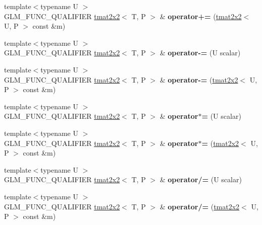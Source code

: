 \begin{DoxyCompactItemize}
{\footnotesize template$<$typename U $>$ }\\G\+L\+M\+\_\+\+F\+U\+N\+C\+\_\+\+Q\+U\+A\+L\+I\+F\+I\+ER \hyperlink{structglm_1_1tmat2x2}{tmat2x2}$<$ T, P $>$ \& {\bfseries operator+=} (\hyperlink{structglm_1_1tmat2x2}{tmat2x2}$<$ U, P $>$ const \&m)
\item 
\mbox{\label{structglm_1_1tmat2x2_a07fbdd2d18d893c7d6c1b662786983ea}} 
{\footnotesize template$<$typename U $>$ }\\G\+L\+M\+\_\+\+F\+U\+N\+C\+\_\+\+Q\+U\+A\+L\+I\+F\+I\+ER \hyperlink{structglm_1_1tmat2x2}{tmat2x2}$<$ T, P $>$ \& {\bfseries operator-\/=} (U scalar)
\item 
\mbox{\label{structglm_1_1tmat2x2_aa547a3bd8160981d285b9fef6cb5eff1}} 
{\footnotesize template$<$typename U $>$ }\\G\+L\+M\+\_\+\+F\+U\+N\+C\+\_\+\+Q\+U\+A\+L\+I\+F\+I\+ER \hyperlink{structglm_1_1tmat2x2}{tmat2x2}$<$ T, P $>$ \& {\bfseries operator-\/=} (\hyperlink{structglm_1_1tmat2x2}{tmat2x2}$<$ U, P $>$ const \&m)
\item 
\mbox{\label{structglm_1_1tmat2x2_afe45ccf1c28b8e1519655b717e75745f}} 
{\footnotesize template$<$typename U $>$ }\\G\+L\+M\+\_\+\+F\+U\+N\+C\+\_\+\+Q\+U\+A\+L\+I\+F\+I\+ER \hyperlink{structglm_1_1tmat2x2}{tmat2x2}$<$ T, P $>$ \& {\bfseries operator$\ast$=} (U scalar)
\item 
\mbox{\label{structglm_1_1tmat2x2_ae5777c0b61d77643916a6228c1bad207}} 
{\footnotesize template$<$typename U $>$ }\\G\+L\+M\+\_\+\+F\+U\+N\+C\+\_\+\+Q\+U\+A\+L\+I\+F\+I\+ER \hyperlink{structglm_1_1tmat2x2}{tmat2x2}$<$ T, P $>$ \& {\bfseries operator$\ast$=} (\hyperlink{structglm_1_1tmat2x2}{tmat2x2}$<$ U, P $>$ const \&m)
\item 
\mbox{\label{structglm_1_1tmat2x2_ad53aeb4165a4776038788c1c03a87c6e}} 
{\footnotesize template$<$typename U $>$ }\\G\+L\+M\+\_\+\+F\+U\+N\+C\+\_\+\+Q\+U\+A\+L\+I\+F\+I\+ER \hyperlink{structglm_1_1tmat2x2}{tmat2x2}$<$ T, P $>$ \& {\bfseries operator/=} (U scalar)
\item 
\mbox{\label{structglm_1_1tmat2x2_a3d12dbc4378d84707572ab61ae1b1b30}} 
{\footnotesize template$<$typename U $>$ }\\G\+L\+M\+\_\+\+F\+U\+N\+C\+\_\+\+Q\+U\+A\+L\+I\+F\+I\+ER \hyperlink{structglm_1_1tmat2x2}{tmat2x2}$<$ T, P $>$ \& {\bfseries operator/=} (\hyperlink{structglm_1_1tmat2x2}{tmat2x2}$<$ U, P $>$ const \&m)
\end{DoxyCompactItemize}
